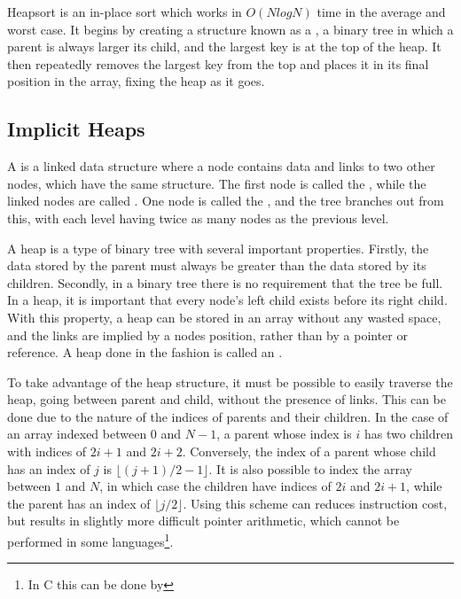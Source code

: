 \label{heap}

Heapsort is an in-place sort which works in $O(NlogN)$ time in the average and
worst case. It begins by creating a structure known as a , a binary tree
in which a parent is always larger its child, and the largest key is at the top
of the heap. It then repeatedly removes the largest key from the top and places
it in its final position in the array, fixing the heap as it goes.

\subsection{Implicit Heaps}

A  is a linked data structure where a node contains data and links
to two other nodes, which have the same structure. The first node is called the
, while the linked nodes are called . One node is called the
, and the tree branches out from this, with each level having twice as many
nodes as the previous level.

A heap is a type of binary tree with several important properties. Firstly, the
data stored by the parent must always be greater than the data stored by its
children. Secondly, in a binary tree there is no requirement that the tree be
full.  In a heap, it is important that every node's left child exists before its
right child. With this property, a heap can be stored in an array without any
wasted space, and the links are implied by a nodes position, rather than by a
pointer or reference. A heap done in the fashion is called an .

To take advantage of the heap structure, it must be possible to easily traverse
the heap, going between parent and child, without the presence of links. This
can be done due to the nature of the indices of parents and their children. In
the case of an array indexed between $0$ and $N-1$, a parent whose index is
$i$ has two children with indices of $2i+1$ and $2i+2$. Conversely, the index of
a parent whose child has an index of $j$ is $\lfloor{}(j+1)/2-1\rfloor{}$. It is
also possible to index the array between $1$ and $N$, in which case the children
have indices of $2i$ and $2i+1$, while the parent has an index of
$\lfloor{}j/2\rfloor{}$. Using this scheme can reduces instruction cost, but
results in slightly more difficult pointer arithmetic, which cannot be performed
in some languages\footnote{In C this can be done by }.


